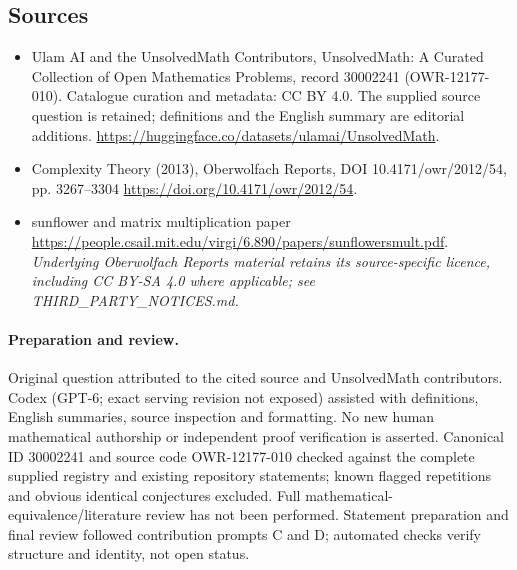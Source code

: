 \documentclass[11pt]{article}
\begin{document}
\subsection{Sources}
\begin{itemize}
\item[\hypertarget{source:30002241:1}{S1}] Ulam AI and the UnsolvedMath Contributors, UnsolvedMath: A Curated Collection of Open Mathematics Problems, record 30002241 (OWR-12177-010). Catalogue curation and metadata: CC BY 4.0. The supplied source question is retained; definitions and the English summary are editorial additions.
\url{https://huggingface.co/datasets/ulamai/UnsolvedMath}.
\item[\hypertarget{source:30002241:2}{S2}] Complexity Theory (2013), Oberwolfach Reports, DOI 10.4171/owr/2012/54, pp. 3267--3304
\url{https://doi.org/10.4171/owr/2012/54}.
\item[\hypertarget{source:30002241:3}{S3}] sunflower and matrix multiplication paper
\url{https://people.csail.mit.edu/virgi/6.890/papers/sunflowersmult.pdf}.
\textit{Underlying Oberwolfach Reports material retains its source-specific licence, including CC BY-SA 4.0 where applicable; see THIRD\_PARTY\_NOTICES.md.}
\end{itemize}
\paragraph{Preparation and review.}
Original question attributed to the cited source and UnsolvedMath contributors. Codex (GPT-6; exact serving revision not exposed) assisted with definitions, English summaries, source inspection and formatting. No new human mathematical authorship or independent proof verification is asserted. Canonical ID 30002241 and source code OWR-12177-010 checked against the complete supplied registry and existing repository statements; known flagged repetitions and obvious identical conjectures excluded. Full mathematical-equivalence/literature review has not been performed. Statement preparation and final review followed contribution prompts C and D; automated checks verify structure and identity, not open status.
\label{end:30002241}
\end{document}
